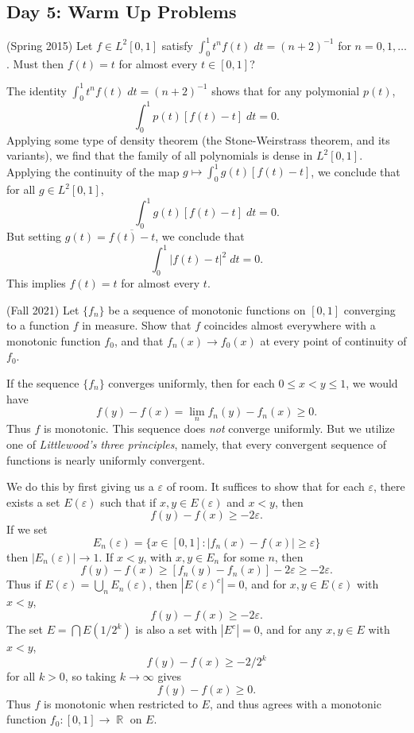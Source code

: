 \documentclass{exam}
\DeclareMathOperator{\RR}{\mathbb{R}}
\theoremstyle{problemstyle}
\newcommand{\1}[1]{\textbf{1}_{\left[#1\right]}} %
\begin{document}
\begin{questions}
\newpage
\section*{Day 5: Warm Up Problems}

\question (Spring 2015) Let $f \in L^2[0,1]$ satisfy $\int_0^1 t^n f(t)\; dt = (n+2)^{-1}$ for $n = 0, 1,\dots$. Must then $f(t) = t$ for almost every $t \in [0,1]$?
\begin{solution}
    The identity $\int_0^1 t^n f(t)\; dt = (n+2)^{-1}$ shows that for any polymonial $p(t)$,
    \[ \int_0^1 p(t) [f(t) - t]\; dt = 0. \]
    Applying some type of density theorem (the Stone-Weirstrass theorem, and its variants), we find that the family of all polynomials is dense in $L^2[0,1]$. Applying the continuity of the map $g \mapsto \int_0^1 g(t) [f(t) - t]$, we conclude that for all $g \in L^2[0,1]$,
    \[ \int_0^1 g(t) [f(t) - t]\; dt = 0. \]
    But setting $g(t) = \overline{f(t) - t}$, we conclude that
    \[ \int_0^1 |f(t) - t|^2\; dt = 0. \]
    This implies $f(t) = t$ for almost every $t$.
\end{solution}

\question (Fall 2021) Let $\{ f_n \}$ be a sequence of monotonic functions on $[0,1]$ converging to a function $f$ in measure. Show that $f$ coincides almost everywhere with a monotonic function $f_0$, and that $f_n(x) \to f_0(x)$ at every point of continuity of $f_0$.
\begin{solution}
	If the sequence $\{ f_n \}$ converges uniformly, then for each $0 \leq x < y \leq 1$, we would have
	\[ f(y) - f(x) = \lim_n f_n(y) - f_n(x) \geq 0. \]
	Thus $f$ is monotonic. This sequence does \emph{not} converge uniformly. But we utilize one of \emph{Littlewood's three principles}, namely, that every convergent sequence of functions is nearly uniformly convergent.

	We do this by first giving us a $\varepsilon$ of room. It suffices to show that for each $\varepsilon$, there exists a set $E(\varepsilon)$ such that if $x,y \in E(\varepsilon)$ and $x < y$, then
	\[ f(y) - f(x) \geq - 2 \varepsilon. \]
	If we set
	\[ E_n(\varepsilon) = \{ x \in [0,1] : |f_n(x) - f(x)| \geq \varepsilon \} \]
	then $|E_n(\varepsilon)| \to 1$. If $x < y$, with $x,y \in E_n$ for some $n$, then
	\[ f(y) - f(x) \geq [f_n(y) - f_n(x)] - 2 \varepsilon \geq -2\varepsilon. \]
	Thus if $E(\varepsilon) = \bigcup_n E_n(\varepsilon)$, then $|E(\varepsilon)^c| = 0$, and for $x,y \in E(\varepsilon)$ with $x < y$,
	\[ f(y) - f(x) \geq - 2 \varepsilon. \]
	The set $E = \bigcap E(1/2^k)$ is also a set with $|E^c| = 0$, and for any $x,y \in E$ with $x < y$,
	\[ f(y) - f(x) \geq - 2 / 2^k \]
	for all $k > 0$, so taking $k \to \infty$ gives
	\[ f(y) - f(x) \geq 0. \]
	Thus $f$ is monotonic when restricted to $E$, and thus agrees with a monotonic function $f_0: [0,1] \to \RR$ on $E$.


\end{solution}
\end{questions}
\end{document}

